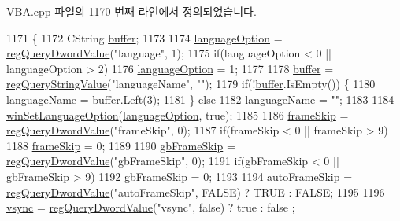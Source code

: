 V\+B\+A.\+cpp 파일의 1170 번째 라인에서 정의되었습니다.


\begin{DoxyCode}
1171 \{
1172   CString \mbox{\hyperlink{_g_b_a_8cpp_a28d4d3d8445e73a696b2d6f7eadabd96}{buffer}};
1173 
1174   \mbox{\hyperlink{class_v_b_a_ac747a07ec2db4bcddea1b4581ebe5c6b}{languageOption}} = \mbox{\hyperlink{_reg_8cpp_a150640889ffff4851ee26d7b999ec7c3}{regQueryDwordValue}}(\textcolor{stringliteral}{"language"}, 1);
1175   \textcolor{keywordflow}{if}(languageOption < 0 || languageOption > 2)
1176     \mbox{\hyperlink{class_v_b_a_ac747a07ec2db4bcddea1b4581ebe5c6b}{languageOption}} = 1;
1177 
1178   \mbox{\hyperlink{_g_b_a_8cpp_a28d4d3d8445e73a696b2d6f7eadabd96}{buffer}} = \mbox{\hyperlink{_reg_8cpp_a618826d274df0d9c19fab2ff28bd9008}{regQueryStringValue}}(\textcolor{stringliteral}{"languageName"}, \textcolor{stringliteral}{""});
1179   \textcolor{keywordflow}{if}(!\mbox{\hyperlink{_g_b_a_8cpp_a28d4d3d8445e73a696b2d6f7eadabd96}{buffer}}.IsEmpty()) \{
1180     \mbox{\hyperlink{class_v_b_a_a9763c257edcdac0bff2b0ecab70ffc80}{languageName}} = \mbox{\hyperlink{_g_b_a_8cpp_a28d4d3d8445e73a696b2d6f7eadabd96}{buffer}}.Left(3);
1181   \} \textcolor{keywordflow}{else}
1182     \mbox{\hyperlink{class_v_b_a_a9763c257edcdac0bff2b0ecab70ffc80}{languageName}} = \textcolor{stringliteral}{""};
1183   
1184   \mbox{\hyperlink{class_v_b_a_ae872998a3ecf3ec0d504378744f441e6}{winSetLanguageOption}}(\mbox{\hyperlink{class_v_b_a_ac747a07ec2db4bcddea1b4581ebe5c6b}{languageOption}}, \textcolor{keyword}{true});
1185   
1186   \mbox{\hyperlink{_globals_8cpp_a668e22999d7fcea3ed14130fd680b795}{frameSkip}} = \mbox{\hyperlink{_reg_8cpp_a150640889ffff4851ee26d7b999ec7c3}{regQueryDwordValue}}(\textcolor{stringliteral}{"frameSkip"}, 0);
1187   \textcolor{keywordflow}{if}(frameSkip < 0 || frameSkip > 9)
1188     \mbox{\hyperlink{_globals_8cpp_a668e22999d7fcea3ed14130fd680b795}{frameSkip}} = 0;
1189 
1190   \mbox{\hyperlink{_g_b_8cpp_a2139360d32d74969f470ef05414ecaf8}{gbFrameSkip}} = \mbox{\hyperlink{_reg_8cpp_a150640889ffff4851ee26d7b999ec7c3}{regQueryDwordValue}}(\textcolor{stringliteral}{"gbFrameSkip"}, 0);
1191   \textcolor{keywordflow}{if}(gbFrameSkip < 0 || gbFrameSkip > 9)
1192     \mbox{\hyperlink{_g_b_8cpp_a2139360d32d74969f470ef05414ecaf8}{gbFrameSkip}} = 0;
1193 
1194   \mbox{\hyperlink{class_v_b_a_a9ecbee7d82db73b24aee3afb66128388}{autoFrameSkip}} = \mbox{\hyperlink{_reg_8cpp_a150640889ffff4851ee26d7b999ec7c3}{regQueryDwordValue}}(\textcolor{stringliteral}{"autoFrameSkip"}, FALSE) ? TRUE : FALSE;
1195   
1196   \mbox{\hyperlink{class_v_b_a_a84075b77df64f3dc2100159064b79fba}{vsync}} = \mbox{\hyperlink{_reg_8cpp_a150640889ffff4851ee26d7b999ec7c3}{regQueryDwordValue}}(\textcolor{stringliteral}{"vsync"}, \textcolor{keyword}{false}) ? true : false ;

\end{DoxyCode}
